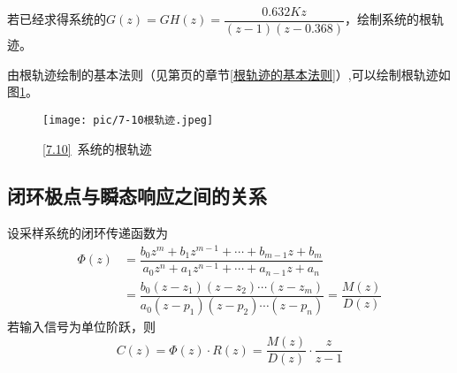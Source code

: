 \examples \label{7.10}若已经求得系统的$G(z) = GH(z) = \dfrac{0.632Kz}{(z-1)(z-0.368)}$，绘制系统的根轨迹。

\solve 由根轨迹绘制的基本法则（见第\pageref{根轨迹的基本法则}页的章节\ref{根轨迹的基本法则}）,可以绘制根轨迹如图\ref{7.10-1}。
\begin{figure}[!htb]
	\centering
	\vspace*{-1em}
	\texttt{[image: pic/7-10根轨迹.jpeg]}
	\vspace*{-1em}
	\caption{\ref{7.10}$\,$ 系统的根轨迹}
	\label{7.10-1}
\end{figure}

\subsection{闭环极点与瞬态响应之间的关系}
设采样系统的闭环传递函数为
\begin{align}
	\varPhi(z) &= \dfrac{b_0 z^m + b_1 z^{m-1}+\cdots + b_{m-1}z+b_m}{a_0 z^n + a_1 z^{n-1}+\cdots + a_{n-1}z +a_n}\\[0.5em]
	& = \dfrac{b_0(z-z_1)(z-z_2)\cdots(z-z_m)}{a_0(z-p_1)(z-p_2)\cdots(z-p_n)} = \dfrac{M(z)}{D(z)}
\end{align}
若输入信号为单位阶跃，则
\begin{equation}
	C(z) = \varPhi(z)\cdot R(z)  = \dfrac{M(z)}{D(z)}\cdot \dfrac{z}{z-1}
\end{equation}

